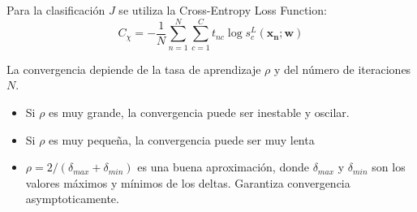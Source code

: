 Para la clasificación $J$ se utiliza la Cross-Entropy Loss Function:
\[
C_\chi = -\frac{1}{N}\sum_{n=1}^{N} \sum_{c=1}^{C} t_{nc} \log s_c^L(\mathbf{x_n};\mathbf{w})
\]

La convergencia depiende de la tasa de aprendizaje $\rho$ y del número de iteraciones $N$.
\begin{itemize}
   \item  Si $\rho$ es muy grande, la convergencia puede ser inestable y oscilar.
   \item Si $\rho$ es muy pequeña, la convergencia puede ser muy lenta
   \item $\rho = 2/(\delta_{max} + \delta_{min})$ es una buena aproximación, donde $\delta_{max}$ y $\delta_{min}$ son los valores máximos y mínimos de los deltas.
   Garantiza convergencia asymptoticamente.
\end{itemize}
